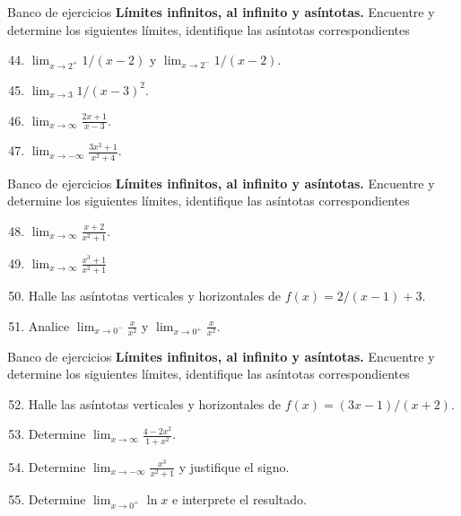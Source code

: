 \documentclass[12pt,aspectratio=169]{beamer}
\begin{document}
\begin{frame}[t,allowframebreaks]{Banco de ejercicios}
\small
\noindent \textbf{Límites infinitos, al infinito y asíntotas.} Encuentre y determine los siguientes l\'imites, identifique las as\'intotas correspondientes\par\smallskip
\begin{enumerate}\setcounter{enumi}{43}
\item $\lim_{x\to2^+}1/(x-2)$ y $\lim_{x\to2^-}1/(x-2)$.
\item $\lim_{x\to3}1/(x-3)^2$.
\item $\displaystyle\lim_{x\to\infty}\frac{2x+1}{x-3}$.
\item $\displaystyle\lim_{x\to-\infty}\frac{3x^2+1}{x^2+4}$.
\end{enumerate}
\end{frame}


\begin{frame}[t,allowframebreaks]{Banco de ejercicios}
\small
\noindent \textbf{Límites infinitos, al infinito y asíntotas.} Encuentre y determine los siguientes l\'imites, identifique las as\'intotas correspondientes\par\smallskip
\begin{enumerate}\setcounter{enumi}{47}
\item $\displaystyle\lim_{x\to\infty}\frac{x+2}{x^2+1}$.
\item $\displaystyle\lim_{x\to\infty}\frac{x^3+1}{x^2+1}$
\item Halle las asíntotas verticales y horizontales de $f(x)=2/(x-1)+3$.
\item Analice $\displaystyle\lim_{x\to0^-}\frac{x}{x^2}$ y $\displaystyle\lim_{x\to0^+}\frac{x}{x^2}$.
\end{enumerate}
\end{frame}


\begin{frame}[t,allowframebreaks]{Banco de ejercicios}
\small
\noindent \textbf{Límites infinitos, al infinito y asíntotas.} Encuentre y determine los siguientes l\'imites, identifique las as\'intotas correspondientes\par\smallskip
\begin{enumerate}\setcounter{enumi}{51}
\item Halle las asíntotas verticales y horizontales de $f(x)=(3x-1)/(x+2)$.
\item Determine $\displaystyle\lim_{x\to\infty}\frac{4-2x^2}{1+x^2}$.
\item Determine $\displaystyle\lim_{x\to-\infty}\frac{x^3}{x^2+1}$ y justifique el signo.
\item Determine $\displaystyle\lim_{x\to0^+}\ln x$ e interprete el resultado.
\end{enumerate}
\end{frame}
\end{document}
